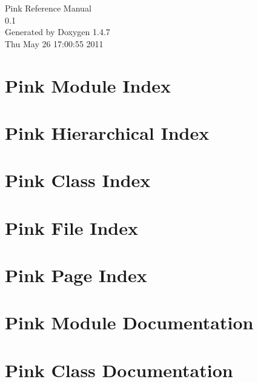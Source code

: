 \documentclass[a4paper]{book}
\begin{document}
\begin{titlepage}
\vspace*{7cm}
\begin{center}
{\Large Pink Reference Manual\\[1ex]\large 0.1 }\\
\vspace*{1cm}
{\large Generated by Doxygen 1.4.7}\\
\vspace*{0.5cm}
{\small Thu May 26 17:00:55 2011}\\
\end{center}
\end{titlepage}
\clearemptydoublepage
{}
\tableofcontents
\clearemptydoublepage
{}
\chapter{Pink Module Index}

\chapter{Pink Hierarchical Index}

\chapter{Pink Class Index}

\chapter{Pink File Index}

\chapter{Pink Page Index}

\chapter{Pink Module Documentation}















\chapter{Pink Class Documentation}











\end{document}
